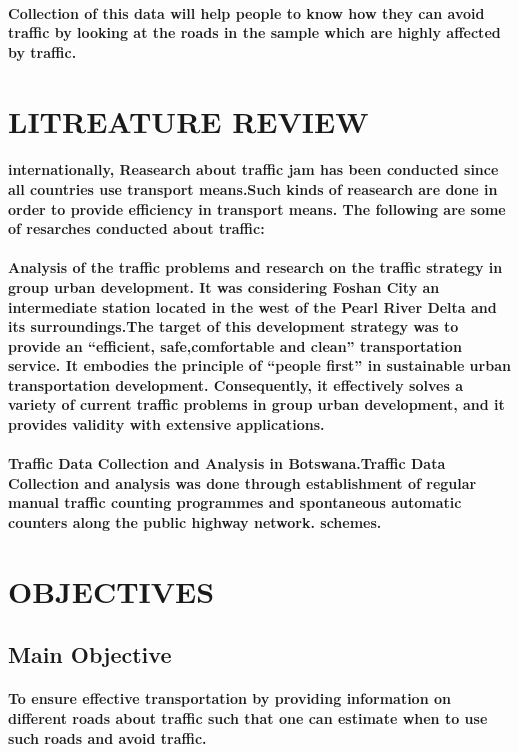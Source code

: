 \documentclass{article}
\begin{document}
\paragraph{Collection of this data will help people to know how they can avoid traffic by looking at the roads in the sample which are highly affected by traffic.}
\section{LITREATURE REVIEW}
\paragraph{internationally, Reasearch about traffic jam has been conducted since all countries use transport means.Such kinds of reasearch are done in order to provide efficiency in transport means.
The following are some of resarches conducted about traffic:}
\paragraph{Analysis of the traffic problems and research on the traffic strategy in group urban development. It was considering Foshan City  an intermediate station located in the west of the Pearl River Delta and its surroundings.The target of this development strategy was to provide an “efficient, safe,comfortable and clean” transportation service. It embodies the principle of “people first” in sustainable urban transportation development. Consequently, it effectively solves a variety of current traffic problems in group urban development, and it provides validity with
extensive applications.}
\paragraph{Traffic Data Collection and Analysis in Botswana.Traffic Data Collection and analysis was done through establishment of regular manual traffic counting programmes and spontaneous automatic counters along the public highway network.
schemes.}
\section{OBJECTIVES}
\subsection{Main Objective}
\paragraph{To ensure effective transportation by providing information on different roads about traffic such that one can estimate when to use such roads and avoid traffic.}
\end{document}
